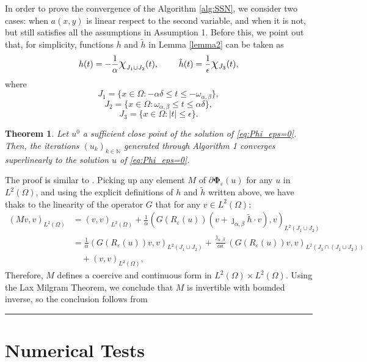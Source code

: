 \documentclass[11pt,a4paper]{amsart}
\newcommand{\kw}{\rule{2mm}{2mm}}
\newcommand{\om}{\Omega}
\renewenvironment{proof}{{Proof.}}{\hfill\kw}
\newtheorem{theorem}{{Theorem}}
\begin{document}
In order to prove the convergence of the Algorithm \ref{alg:SSN}, we consider two cases: when $a(x,y)$ is linear respect to the second variable, and when it is not, but still satisfies all the assumptions in Assumption 1. Before this, we point out that, for simplicity, functions $h$ and $\tilde{h}$ in Lemma \ref{lemma2} can be taken as
\[
h(t)=-\frac{1}{\alpha}\large{\mathlarger{\chi}}_{J_1\cup J_2}(t), \qquad \tilde{h}(t)=\frac{1}{\epsilon}\mathlarger{\chi}_{J_3}(t),
\]
where
\[
J_1 = \{x\in \om: -\alpha\delta\le t \le -\omega_{\alpha,\beta}\},
\]
\[
J_2 = \{x\in \om: \omega_{\alpha,\beta}\le t\le  \alpha\delta\},
\]
\[
J_3 = \{x\in \om: |t|\le \epsilon\}.
\]
\begin{theorem}
    Let $u^0$ a sufficient close point of the solution of \eqref{eq:Phi_eps=0}. Then, the iterations $(u_k)_{k\in\mathbb{N}}$ generated through Algorithm 1 converges superlinearly to the solution $\hat{u}$ of \eqref{eq:Phi_eps=0}. 
\end{theorem}

\begin{proof}
    The proof is similar to \cite[Theorema 4.3]{stadler2006}. Picking up any element $M$ of $\partial \mathbf{\Phi}_{\varepsilon}(u)$ for any $u$ in $L^2(\om)$, and using the explicit definitions of $h$ and $\tilde{h}$ written above, we have thaks to the linearity of the operator $G$ that for any $v\in L^2(\om)$:
    \begin{align*}
        (Mv,v)_{L^2(\om)}&=(v,v)_{L^2(\om)}+\frac{1}{\alpha}(G(R_{\varepsilon}(u))(v+\jmath_{\alpha,\beta}\tilde{h}\cdot v),v)_{L^2(J_1\cup J_2)}\\
        &= \frac{1}{\alpha}(G(R_{\varepsilon}(u))v,v)_{L^2(J_1\cup J_2)}+\frac{\jmath_{\alpha,\beta}}{\alpha\epsilon}(G(R_{\varepsilon}(u))v,v)_{L^2(J_3\cap (J_1\cup J_2))}\\
        &\quad+(v,v)_{L^2(\om)},
    \end{align*}
    Therefore, $M$ defines a coercive and continuous form in $L^2(\om)\times L^2(\om)$. Using the Lax Milgram Theorem, we conclude that $M$ is invertible with bounded inverse, so the conclusion follows from \cite[Theorem 3.13]{ulbrich2002}
\end{proof}



\section{Numerical Tests}
\end{document}
